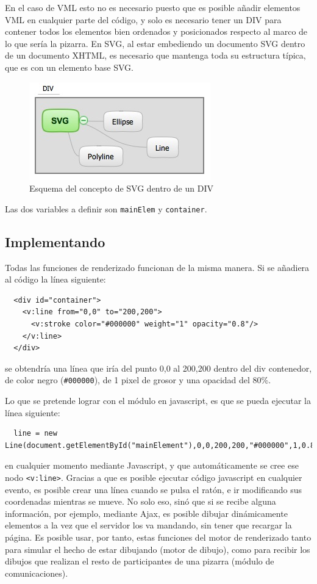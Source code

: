 En el caso de VML esto no es necesario puesto que es posible añadir elementos VML en cualquier parte del código, y solo es necesario tener un DIV para contener todos los elementos bien ordenados y posicionados respecto al marco de lo que sería la pizarra. En SVG, al estar embediendo un documento SVG dentro de un documento XHTML, es necesario que mantenga toda su estructura típica, que es con un elemento base SVG.

\begin{figure}[h!]
\centering
\includegraphics{divsvg.png}
\caption{Esquema del concepto de SVG dentro de un DIV}\label{fig:divsvg}
\end{figure}

Las dos variables a definir son \texttt{mainElem} y \texttt{container}.

\subsection{Implementando}
Todas las funciones de renderizado funcionan de la misma manera. Si se añadiera al código la línea siguiente:
\begin{verbatim}
  <div id="container">
    <v:line from="0,0" to="200,200">
      <v:stroke color="#000000" weight="1" opacity="0.8"/>
    </v:line>
  </div>
\end{verbatim}
se obtendría una línea que iría del punto 0,0 al 200,200 dentro del div contenedor, de color negro (\texttt{\#000000}), de 1 pixel de grosor y una opacidad del 80\%.

Lo que se pretende lograr con el módulo en javascript, es que se pueda ejecutar la línea siguiente:
\begin{verbatim}
  line = new Line(document.getElementById("mainElement"),0,0,200,200,"#000000",1,0.8);
\end{verbatim}
en cualquier momento mediante Javascript, y que automáticamente se cree ese nodo \texttt{<v:line>}. Gracias a que es posible ejecutar código javascript en cualquier evento, es posible crear una línea cuando se pulsa el ratón, e ir modificando sus coordenadas mientras se mueve. No solo eso, sinó que si se recibe alguna información, por ejemplo, mediante Ajax, es posible dibujar dinámicamente elementos a la vez que el servidor los va mandando, sin tener que recargar la página. Es posible usar, por tanto, estas funciones del motor de renderizado tanto para simular el hecho de estar dibujando (motor de dibujo), como para recibir los dibujos que realizan el resto de participantes de una pizarra (módulo de comunicaciones).

